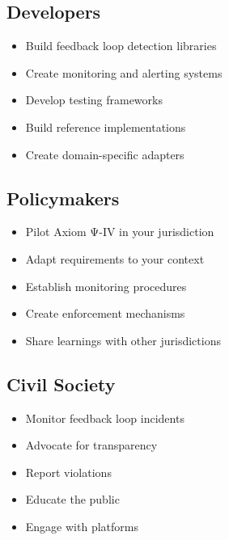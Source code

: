 \subsection{Developers}

\begin{itemize}
    \item Build feedback loop detection libraries
    \item Create monitoring and alerting systems
    \item Develop testing frameworks
    \item Build reference implementations
    \item Create domain-specific adapters
\end{itemize}

\subsection{Policymakers}

\begin{itemize}
    \item Pilot Axiom Ψ-IV in your jurisdiction
    \item Adapt requirements to your context
    \item Establish monitoring procedures
    \item Create enforcement mechanisms
    \item Share learnings with other jurisdictions
\end{itemize}

\subsection{Civil Society}

\begin{itemize}
    \item Monitor feedback loop incidents
    \item Advocate for transparency
    \item Report violations
    \item Educate the public
    \item Engage with platforms
\end{itemize}

\cleardoublepage
